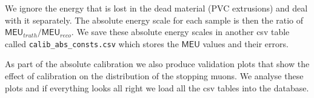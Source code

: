 We ignore the energy that is lost in the dead material (PVC extrusions) and deal with it separately. The absolute energy scale for each sample is then the ratio of $\textsf{MEU}_{truth}/\textsf{MEU}_{reco}$. We save these absolute energy scales in another csv table called \texttt{calib\_abs\_consts.csv} which stores the $\textsf{MEU}$ values and their errors.

As part of the absolute calibration we also produce validation plots that show the effect of calibration on the distribution of the stopping muons. We analyse these plots and if everything looks all right we load all the csv tables into the database.


